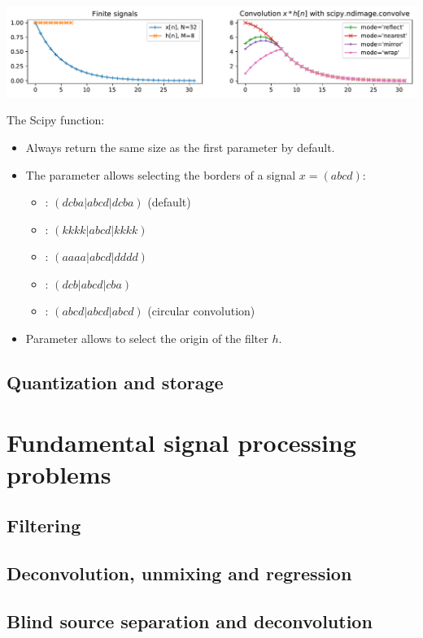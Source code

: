 \begin{center}
  \includegraphics[width=1\linewidth]{imgs/sig_conv/conv_scipy_ndimage.pdf}

\end{center}\vspace{-2mm}

\begin{block}{The Scipy   function:}\vspace{-2mm}
  \begin{itemize}
      \item Always return the same size as the first parameter by default.
      \item  The  parameter allows selecting the borders of a signal $x=(abcd)$:
      \begin{itemize}
          \item {} : $(d c b a | a b c d | d c b a)$ (default)
          \item  {} : $(k k k k | a b c d | k k k k)$
          \item {} : $(a a a a | a b c d | d d d d)$
          \item {} : $(d c b | a b c d | c b a)$
          \item {} : $(a b c d | a b c d | a b c d)$ (circular convolution)
      \end{itemize}
      \item  Parameter  allows to select the origin of the filter $h$.
  \end{itemize}
  


\end{block}


\subsection{Quantization and storage}
\label{sec:}

\section{Fundamental signal processing problems}
\label{sec:sp_prob}

\subsection{Filtering}


\subsection{Deconvolution, unmixing and regression}


\subsection{Blind source separation and deconvolution}




